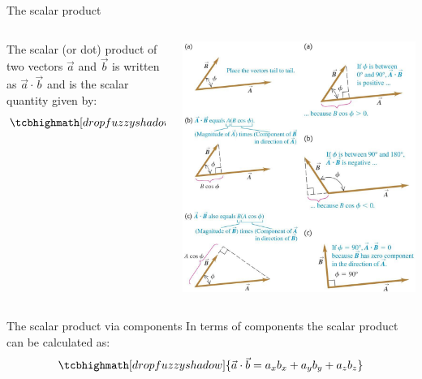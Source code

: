 \documentclass[18pt]{LectMechanics}
\begin{document}
\begin{frame}[t]{The scalar product}{}
	\begin{columns}
		\begin{column}{0.5\linewidth}
			The scalar (or dot) product of two vectors $\vec a$ and $\vec b$ is written as $\vec a \cdot \vec b$ and is the scalar quantity given by:
			\begin{equation*}
				\tcbhighmath[drop fuzzy shadow]{\vec a \cdot \vec b = ab\cos\phi}
			\end{equation*}
		\end{column}
		\begin{column}{0.5\linewidth}
			\begin{center}
				\includegraphics[width=\linewidth]{Scalar_prod}
			\end{center}
		\end{column}
	\end{columns}

\end{frame}

\begin{frame}{The scalar product via components}{}
	In terms of components the scalar product can be calculated as:
	\begin{equation*}
		\tcbhighmath[drop fuzzy shadow]{\vec a \cdot \vec b = a_x b_x + a_yb_y + a_zb_z}
	\end{equation*}
\end{frame}
\end{document}
